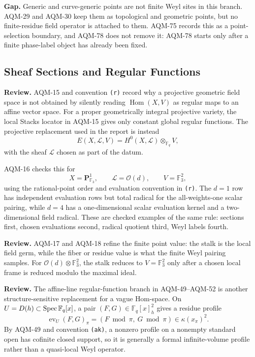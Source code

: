 \textbf{Gap.}  Generic and curve-generic points are not finite Weyl sites in
this branch.  AQM-29 and AQM-30 keep them as topological and geometric points,
but no finite-residue field operator is attached to them.  AQM-75 records
this as a point-selection boundary, and AQM-78 does not remove it: AQM-78
starts only after a finite phase-label object has already been fixed.

\subsection{Sheaf Sections and Regular Functions}

\textbf{Review.}  AQM-15 and convention \texttt{(r)} record why a projective
geometric field space is not obtained by silently reading
\(\operatorname{Hom}(X,V)\) as regular maps to an affine vector space.  For a
proper geometrically integral projective variety, the local Stacks locator in
AQM-15 gives only constant global regular functions.  The projective
replacement used in the report is instead
\[
  E(X,\mathcal L,V)=H^0(X,\mathcal L)\otimes_{\mathbb F_q}V,
\]
with the sheaf \(\mathcal L\) chosen as part of the datum.

AQM-16 checks this for
\[
  X=\mathbf P^1_{\mathbb F_3},\qquad
  \mathcal L=\mathcal O(d),\qquad V=\mathbb F_3^2,
\]
using the rational-point order and evaluation convention in
\texttt{(r)}.  The \(d=1\) row has independent evaluation rows but total
radical for the all-weights-one scalar pairing, while \(d=4\) has a
one-dimensional scalar evaluation kernel and a two-dimensional field radical.
These are checked examples of the same rule: sections first, chosen
evaluations second, radical quotient third, Weyl labels fourth.

\textbf{Review.}  AQM-17 and AQM-18 refine the finite point value: the stalk
is the local field germ, while the fiber or residue value is what the finite
Weyl pairing samples.  For \(\mathcal O(d)\otimes\mathbb F_3^2\), the stalk
reduces to \(V=\mathbb F_3^2\) only after a chosen local frame is reduced
modulo the maximal ideal.

\textbf{Review.}  The affine-line regular-function branch in AQM-49--AQM-52
is another structure-sensitive replacement for a vague Hom-space.  On
\(U=D(h)\subset\operatorname{Spec}\mathbb F_q[x]\), a pair
\((F,G)\in\mathbb F_q[x]_h^2\) gives a residue profile
\[
  \operatorname{ev}_U(F,G)_\pi=(F\bmod\pi,\ G\bmod\pi)\in\kappa(x_\pi)^2.
\]
By AQM-49 and convention \texttt{(ak)}, a nonzero profile on a nonempty
standard open has cofinite closed support, so it is generally a formal
infinite-volume profile rather than a quasi-local Weyl operator.

